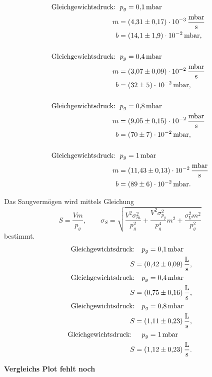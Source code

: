 \begin{align*}
  \text{Gleichgewichtsdruck: } &\, p_g=\SI{0.1}{\milli\bar} \\
  m&= \SI{4.31\pm 0.17 e-3 }{\milli\bar\per\second}\\
  b&=\SI{14.1\pm1.9 e-2}{\milli\bar},\\
  \\
  \text{Gleichgewichtsdruck: } &\, p_g=\SI{0.4}{\milli\bar} \\
  m&= \SI{3.07\pm 0.09 e-2 }{\milli\bar\per\second}\\
  b&=\SI{32\pm5 e-2}{\milli\bar},\\
  \\
  \text{Gleichgewichtsdruck: } &\, p_g=\SI{0.8}{\milli\bar}\\
  m&= \SI{9.05\pm 0.15 e-2 }{\milli\bar\per\second}\\
  b&=\SI{70\pm7 e-2}{\milli\bar},\\
  \\
  \text{Gleichgewichtsdruck: } &\, p_g=\SI{1}{\milli\bar}\\
  m&= \SI{11.43\pm 0.13 e-2 }{\milli\bar\per\second}\\
  b&=\SI{89\pm 6 e-2}{\milli\bar}.
\end{align*}

Das Saugvermögen wird mittels Gleichung
\begin{equation}
  \label{eq:saug_leck}
  S=\frac{Vm}{p_g}, \qquad \sigma_{S}=\sqrt{\frac{V^{2} \sigma_{m}^{2}}{p_{g}^{2}} + \frac{V^{2} \sigma_{p_{g}}^{2}}{p_{g}^{4}} m^{2} + \frac{\sigma_{V}^{2} m^{2}}{p_{g}^{2}}}
\end{equation}
bestimmt.
\begin{align*}
  \text{Gleichgewichtsdruck:} &\quad p_g=\SI{0.1}{\milli\bar} \\
  S&=\SI{0.42\pm 0.09}{\litre\per\second},
  \\
  \text{Gleichgewichtsdruck:} &\quad p_g=\SI{0.4}{\milli\bar} \\
  S&=\SI{0.75\pm 0.16}{\litre\per\second},
  \\
  \text{Gleichgewichtsdruck:} &\quad p_g=\SI{0.8}{\milli\bar}\\
  S&=\SI{1.11\pm 0.23}{\litre\per\second},
  \\
  \text{Gleichgewichtsdruck: } &\quad p_g=\SI{1}{\milli\bar}\\
  S&=\SI{1.12\pm 0.23}{\litre\per\second}.
\end{align*}

\textbf{Vergleichs Plot fehlt noch}

